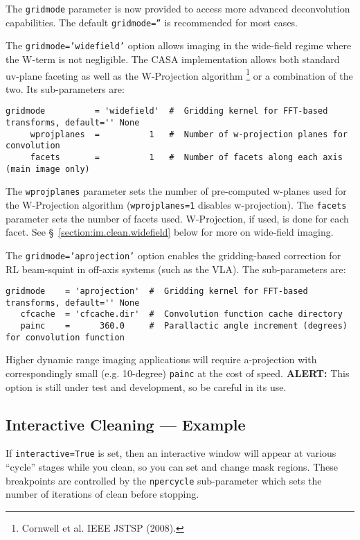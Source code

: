 The {\tt gridmode} parameter is now provided to access more
advanced deconvolution capabilities.  The default 
{\tt gridmode=''} is recommended for most cases.

The {\tt gridmode='widefield'} option allows imaging in the
wide-field regime where the W-term is not negligible.  The
CASA implementation allows both standard uv-plane faceting as
well as the W-Projection algorithm
\footnote{Cornwell et al. IEEE JSTSP (2008).}
or a combination of the two.  Its sub-parameters are:
\small
\begin{verbatim}
gridmode          = 'widefield'  #  Gridding kernel for FFT-based transforms, default='' None
     wprojplanes  =          1   #  Number of w-projection planes for convolution
     facets       =          1   #  Number of facets along each axis (main image only)
\end{verbatim}
\normalsize
The {\tt wprojplanes} parameter sets the number of pre-computed w-planes
used for the W-Projection algorithm ({\tt wprojplanes=1} disables
w-projection).  The {\tt facets} parameter sets the number of facets
used.  W-Projection, if used, is done for each facet.
See \S~\ref{section:im.clean.widefield} below for more on wide-field
imaging. 

The {\tt gridmode='aprojection'} option enables the gridding-based
correction for RL beam-squint in off-axis systems (such as the VLA).
The sub-parameters are:
\small
\begin{verbatim}
gridmode    = 'aprojection'  #  Gridding kernel for FFT-based transforms, default='' None
   cfcache  = 'cfcache.dir'  #  Convolution function cache directory
   painc    =      360.0     #  Parallactic angle increment (degrees) for convolution function
\end{verbatim}
\normalsize
Higher dynamic range imaging applications will require a-projection
with correspondingly small (e.g. 10-degree) {\tt painc} at the cost of
speed.  {\bf ALERT:} This option is still under test and development,
so be careful in its use.

\subsection{Interactive Cleaning --- Example}
\label{section:im.clean.exampleinteractive}

If {\tt interactive=True} is set, then an interactive window
will appear at various ``cycle'' stages while you clean, so you
can set and change mask regions.  These breakpoints are controlled
by the {\tt npercycle} sub-parameter which sets the number of
iterations of clean before stopping.

